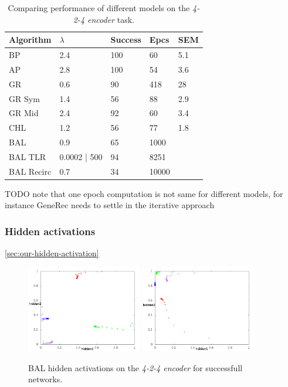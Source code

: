 \begin{table}
  \centering
    \begin{tabular}{|l|l|l|l|l|}
    \hline
    Algorithm&$\lambda$&Success&Epcs&SEM \\
    \hline
    BP&2.4&100&60&5.1\\
    \hline
    AP&2.8&100&54&3.6\\
    \hline
    GR&0.6&90&418&28\\
    \hline
    GR Sym&1.4&56&88&2.9\\
    \hline
    GR Mid&2.4&92&60&3.4\\
    \hline
    CHL&1.2&56&77&1.8\\
    \hline
    BAL&0.9&65&1000&\\
    \hline
    BAL TLR&0.0002 | 500&94&8251&\\
    \hline
    BAL Recirc&0.7&34&10000&\\
    \hline
    \end{tabular}
  \caption{Comparing performance of different models on the \emph{4-2-4 encoder} task.} 
  \label{tab:results-cmp-auto4}
\end{table}

TODO note that one epoch computation is not same for different models, for instance GeneRec needs to settle in the iterative approach 

\subsubsection{Hidden activations}
\ref{sec:our-hidden-activation}  


\begin{figure}[H]
  \centering
  \includegraphics[width=0.45\textwidth]{../presentation/img/nice.png}   
  \includegraphics[width=0.45\textwidth]{../presentation/img/left_top.png}    
  \caption{BAL hidden activations on the \emph{4-2-4 encoder} for successfull networks.}
  \label{fig:results-hidden-activations-bal-good}
\end{figure}

